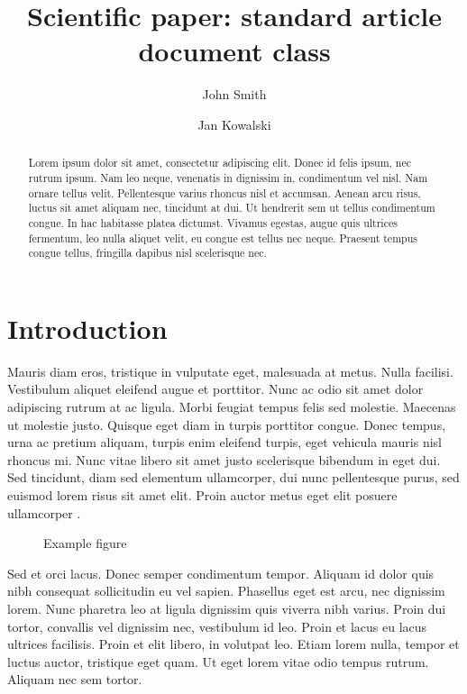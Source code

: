 \documentclass{article}
\begin{document}
\title{Scientific paper: standard article document class}
\author{John Smith \and Jan Kowalski}
\maketitle

\begin{abstract}
Lorem ipsum dolor sit amet, consectetur adipiscing elit. Donec id felis ipsum,
nec rutrum ipsum. Nam leo neque, venenatis in dignissim in, condimentum vel
nisl. Nam ornare tellus velit. Pellentesque varius rhoncus nisl et accumsan.
Aenean arcu risus, luctus sit amet aliquam nec, tincidunt at dui. Ut hendrerit
sem ut tellus condimentum congue. In hac habitasse platea dictumst. Vivamus
egestas, augue quis ultrices fermentum, leo nulla aliquet velit, eu congue est
tellus nec neque. Praesent tempus congue tellus, fringilla dapibus nisl
scelerisque nec.
\end{abstract}

\section{Introduction}
\label{sec:intro}
Mauris diam eros, tristique in vulputate eget, malesuada at metus. Nulla
facilisi. Vestibulum aliquet eleifend augue et porttitor. Nunc ac odio sit amet
dolor adipiscing rutrum at ac ligula. Morbi feugiat tempus felis sed molestie.
Maecenas ut molestie justo. Quisque eget diam in turpis porttitor congue. Donec
tempus, urna ac pretium aliquam, turpis enim eleifend turpis, eget vehicula
mauris nisl rhoncus mi. Nunc vitae libero sit amet justo scelerisque bibendum
in eget dui. Sed tincidunt, diam sed elementum ullamcorper, dui nunc
pellentesque purus, sed euismod lorem risus sit amet elit. Proin auctor metus
eget elit posuere ullamcorper \cite{smith.kowalski:running}.

\begin{figure}
  
  \caption{Example figure}
\end{figure}

Sed et orci lacus. Donec semper condimentum tempor. Aliquam id dolor quis nibh
consequat sollicitudin eu vel sapien. Phasellus eget est arcu, nec dignissim
lorem. Nunc pharetra leo at ligula dignissim quis viverra nibh varius. Proin
dui tortor, convallis vel dignissim nec, vestibulum id leo. Proin et lacus eu
lacus ultrices facilisis. Proin et elit libero, in volutpat leo. Etiam lorem
nulla, tempor et luctus auctor, tristique eget quam. Ut eget lorem vitae odio
tempus rutrum. Aliquam nec sem tortor. 
\end{document}
